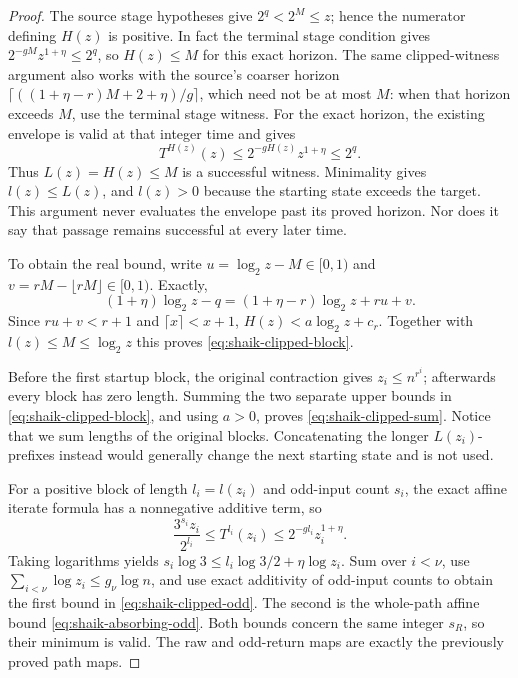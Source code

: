 \documentclass[11pt]{article}
\theoremstyle{remark}\newtheorem{remark}[proposition]{Remark}
\begin{document}
\begin{proof}
The source stage hypotheses give \(2^q<2^M\le z\); hence the numerator
defining \(H(z)\) is positive. In fact the terminal stage condition gives
\(2^{-gM}z^{1+\eta}\le2^q\), so \(H(z)\le M\) for this exact horizon.
The same clipped-witness argument also works with the source's coarser
horizon \(\lceil((1+\eta-r)M+2+\eta)/g\rceil\), which need not be at most
\(M\): when that horizon exceeds \(M\), use the terminal stage witness.
For the exact horizon, the existing envelope
is valid at that integer time and gives
\[
 T^{H(z)}(z)\le 2^{-gH(z)}z^{1+\eta}\le2^q .
\]
Thus \(L(z)=H(z)\le M\) is a successful witness. Minimality gives
\(l(z)\le L(z)\), and \(l(z)>0\) because the starting state exceeds
the target. This argument never evaluates the envelope past its
proved horizon. Nor does it say that passage remains successful at
every later time.

To obtain the real bound, write \(u=\log_2z-M\in[0,1)\) and
\(v=rM-\lfloor rM\rfloor\in[0,1)\). Exactly,
\[
 (1+\eta)\log_2z-q
   =(1+\eta-r)\log_2z+ru+v .
\]
Since \(ru+v<r+1\) and \(\lceil x\rceil<x+1\),
\(H(z)<a\log_2z+c_r\). Together with \(l(z)\le M\le\log_2z\)
this proves \eqref{eq:shaik-clipped-block}.

Before the first startup block, the original contraction gives
\(z_i\le n^{r^i}\); afterwards every block has zero length.
Summing the two separate upper bounds in
\eqref{eq:shaik-clipped-block}, and using \(a>0\), proves
\eqref{eq:shaik-clipped-sum}. Notice that we sum lengths of the
original blocks. Concatenating the longer \(L(z_i)\)-prefixes instead
would generally change the next starting state and is not used.

For a positive block of length \(l_i=l(z_i)\) and odd-input count
\(s_i\), the exact affine iterate formula has a nonnegative additive
term, so
\[
 \frac{3^{s_i}z_i}{2^{l_i}}
 \le T^{l_i}(z_i)\le2^{-g l_i}z_i^{1+\eta}.
\]
Taking logarithms yields
\(s_i\log3\le l_i\log3/2+\eta\log z_i\).
Sum over \(i<\nu\), use
\(\sum_{i<\nu}\log z_i\le g_\nu\log n\), and use exact additivity
of odd-input counts to obtain the first bound in
\eqref{eq:shaik-clipped-odd}. The second is the whole-path affine
bound \eqref{eq:shaik-absorbing-odd}. Both bounds concern the same
integer \(s_R\), so their minimum is valid. The raw and odd-return
maps are exactly the previously proved path maps.
\end{proof}
\end{document}
